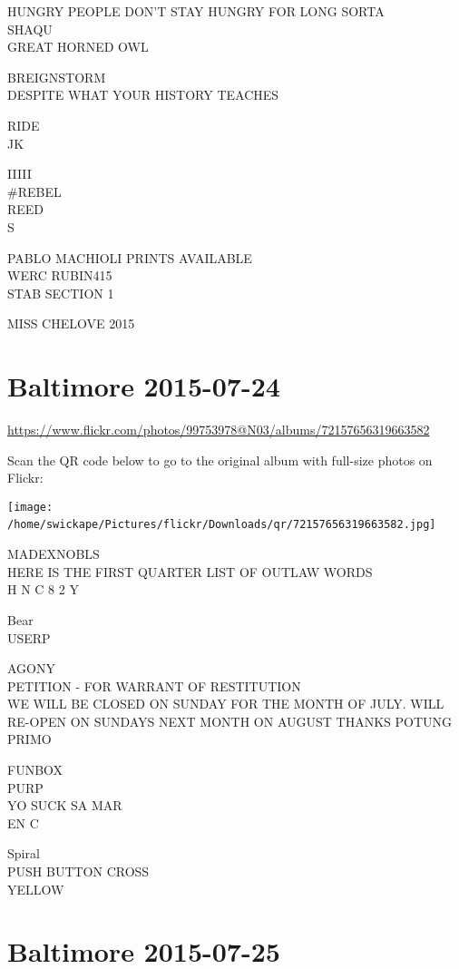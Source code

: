 \documentclass[10pt,letterpaper]{article}
\begin{document}
HUNGRY PEOPLE DON'T STAY HUNGRY FOR LONG SORTA\\
SHAQU\\
GREAT HORNED OWL

BREIGNSTORM\\
DESPITE WHAT YOUR HISTORY TEACHES

RIDE\\
JK

IIIII\\
\#REBEL\\
REED\\
S

PABLO MACHIOLI PRINTS AVAILABLE\\
WERC RUBIN415\\
STAB SECTION 1

MISS CHELOVE 2015
\

\section*{Baltimore 2015-07-24}

\url{https://www.flickr.com/photos/99753978@N03/albums/72157656319663582}

Scan the QR code below to go to the original album with full-size photos on Flickr:

\texttt{[image: /home/swickape/Pictures/flickr/Downloads/qr/72157656319663582.jpg]}
\

MADEXNOBLS\\
HERE IS THE FIRST QUARTER LIST OF OUTLAW WORDS\\
H N C 8 2 Y

Bear\\
USERP

AGONY\\
PETITION {-} FOR WARRANT OF RESTITUTION\\
WE WILL BE CLOSED ON SUNDAY FOR THE MONTH OF JULY.  WILL RE{-}OPEN ON SUNDAYS NEXT MONTH ON AUGUST THANKS POTUNG\\
PRIMO

FUNBOX\\
PURP\\
YO SUCK SA MAR\\
EN C

Spiral\\
PUSH BUTTON CROSS\\
YELLOW
\

\section*{Baltimore 2015-07-25}
\end{document}
